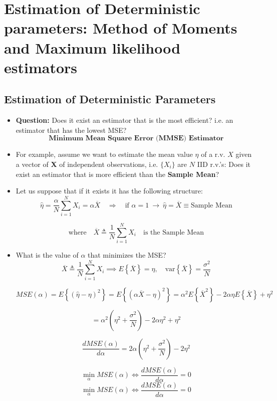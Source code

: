 \section{Estimation of Deterministic parameters: Method of Moments and Maximum likelihood estimators}

\subsection{Estimation of Deterministic Parameters}

\begin{itemize}
    \item \textbf{Question:} Does it exist an estimator that is the most efficient? i.e. an estimator that has the lowest MSE?
    \[
    \textbf{Minimum Mean Square Error (MMSE) Estimator}
    \]
    \item For example, assume we want to estimate the mean value \(\eta\) of a r.v. \(X\) given a vector of \textbf{X} of independent observations, i.e. \(\{X_i\}\) are \(N\) IID r.v.'s: Does it exist an estimator that is more efficient than the \textbf{Sample Mean}?
    \item Let us suppose that if it exists it has the following structure:
 \[
\hat{\eta} = \frac{\alpha}{N} \sum_{i=1}^N X_i = \alpha \overline{X}
\quad \Rightarrow \quad \text{if } \alpha = 1 \ \rightarrow \ 
\hat{\eta} = \overline{X} \equiv \text{Sample Mean}
\]

\[
\text{where} \quad
\overline{X} \triangleq \frac{1}{N}\sum_{i=1}^{N} X_i 
\quad \text{is the Sample Mean}
\]
    \item What is the value of \(\alpha\) that minimizes the MSE?
\[    \overline{X} \triangleq \frac{1}{N} \sum_{i=1}^{N} X_i 
\implies 
E\left\{\overline{X}\right\} = \eta, \quad
\mathrm{var}\left\{\overline{X}\right\} = \frac{\sigma^2}{N}
\]

\[
MSE(\alpha) = E\left\{ (\hat{\eta} - \eta)^2 \right\}
= E\left\{ (\alpha \overline{X} - \eta)^2 \right\}
= \alpha^2 E\left\{ \overline{X}^2 \right\} 
- 2\alpha\eta E\left\{ \overline{X} \right\} + \eta^2
\]

\[
= \alpha^2 \left( \eta^2 + \frac{\sigma^2}{N} \right)
- 2\alpha \eta^2 + \eta^2
\]

\[
\frac{d MSE(\alpha)}{d \alpha} = 2\alpha \left( \eta^2 + \frac{\sigma^2}{N} \right) - 2\eta^2
\]

\[
\min_{\alpha} MSE(\alpha) \iff \frac{d MSE(\alpha)}{d \alpha} = 0
\]    
$$
\min_{\alpha} MSE(\alpha) \iff \frac{d MSE(\alpha)}{d \alpha} = 0
$$


\end{itemize}
